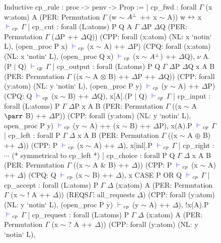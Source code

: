 \begin{figure}
\begin{coq}
Inductive cp_rule : proc -> penv -> Prop :=
  | cp_fwd : forall $\Gamma$ (x w:atom) A
             (PER: Permutation $\Gamma$ (w $\sim$ $A^\bot$ ++ x $\sim$ A))
           w ${\leftrightarrow}$ x ${\color{blue} {} \vdash {}}_{cp}$ $\Gamma$
  | cp_cut :
      forall (L:atoms) P Q A $\Gamma$ $\Delta$P $\Delta$Q
             (PER: Permutation $\Gamma$ ($\Delta$P ++ $\Delta$Q))
             (CPP: forall (x:atom) (NL: x `notin` L),
                     (open_proc P x) ${\color{blue} {} \vdash {}}_{cp}$ (x $\sim$ A) ++ $\Delta$P)
             (CPQ: forall (x:atom) (NL: x `notin` L),
                (open_proc Q x) ${\color{blue} {} \vdash {}}_{cp}$ (x $\sim$ $A^\bot$) ++ $\Delta$Q),
        $\nu$ A.(P $\mid$ Q) ${\color{blue} {} \vdash {}}_{cp}$ $\Gamma$
  | cp_output : forall (L:atoms) P Q $\Gamma$ $\Delta$P $\Delta$Q x A B
                  (PER: Permutation $\Gamma$ ((x $\sim$ A $\otimes$ B) ++
                                               $\Delta$P ++ $\Delta$Q))
                  (CPP: forall (y:atom) (NL: y `notin` L),
                          (open_proc P y) ${\color{blue} {} \vdash {}}_{cp}$ (y $\sim$ A) ++ $\Delta$P)
                  (CPQ: Q ${\color{blue} {} \vdash {}}_{cp}$ (x $\sim$ B) ++ $\Delta$Q),
              x[A].(P $\mid$ Q) ${\color{blue} {} \vdash {}}_{cp}$ $\Gamma$
  | cp_input : forall (L:atoms) P $\Gamma$ $\Delta$P x A B
         (PER: Permutation $\Gamma$ ((x $\sim$ A $\parr$ B) ++ $\Delta$P))
         (CPP: forall (y:atom) (NL: y `notin` L),
            open_proc P y) ${\color{blue} {} \vdash {}}_{cp}$ (y $\sim$ A) ++ (x $\sim$ B) ++ $\Delta$P),
        x(A).P ${\color{blue} {} \vdash {}}_{cp}$ $\Gamma$
  | cp_left : forall P $\Gamma$ $\Delta$ x A B
            (PER: Permutation $\Gamma$ ((x $\sim$ A $\oplus$ B) ++ $\Delta$))
            (CPP: P ${\color{blue} {} \vdash {}}_{cp}$ (x $\sim$ A) ++ $\Delta$),
          x[inl].P ${\color{blue} {} \vdash {}}_{cp}$ $\Gamma$
  | cp_right : $\cdots$ (* symmetrical to cp_left *)
  | cp_choice : forall P Q $\Gamma$ $\Delta$ x A B
                  (PER: Permutation $\Gamma$ ((x $\sim$ A & B) ++ $\Delta$))
                  (CPP: P ${\color{blue} {} \vdash {}}_{cp}$ (x $\sim$ A) ++ $\Delta$)
                  (CPQ: Q ${\color{blue} {} \vdash {}}_{cp}$ (x $\sim$ B) ++ $\Delta$),
                x CASE P OR Q ${\color{blue} {} \vdash {}}_{cp}$ $\Gamma$
  | cp_accept : forall (L:atoms) P $\Gamma$ $\Delta$ (x:atom) A
                  (PER: Permutation $\Gamma$ (x $\sim$ ! A ++ $\Delta$))
                  (REQS$\Gamma$: all_requests $\Delta$)
                  (CPP: forall (y:atom) (NL: y `notin` L),
                         (open_proc P y) ${\color{blue} {} \vdash {}}_{cp}$ (y $\sim$ A) ++ $\Delta$),
                !x(A).P ${\color{blue} {} \vdash {}}_{cp}$ $\Gamma$
  | cp_request : forall (L:atoms) P $\Gamma$ $\Delta$ (x:atom) A
                   (PER: Permutation $\Gamma$ (x $\sim$ ? A ++ $\Delta$))
                   (CPP: forall (y:atom) (NL: y `notin` L),

\end{coq}
\end{figure}
